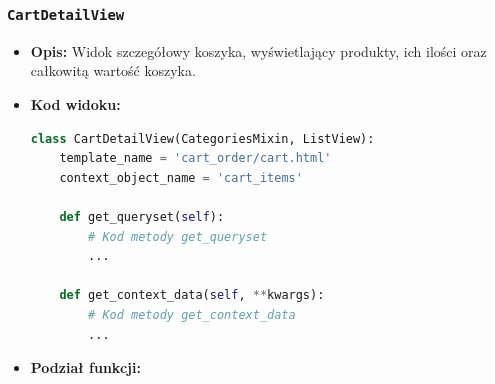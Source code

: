 \documentclass[12pt,a4paper,oneside]{article}
\theoremstyle{definition}
\numberwithin{equation}{section}
\begin{document}
\subsubsection*{\texttt{CartDetailView}}
\begin{itemize}
    \item \textbf{Opis:} Widok szczegółowy koszyka, wyświetlający produkty, ich ilości oraz całkowitą wartość koszyka.
    \item \textbf{Kod widoku:}
\begin{lstlisting}[language=Python, caption=\texttt{CartDetailView}]
class CartDetailView(CategoriesMixin, ListView):
    template_name = 'cart_order/cart.html'
    context_object_name = 'cart_items'

    def get_queryset(self):
        # Kod metody get_queryset
        ...

    def get_context_data(self, **kwargs):
        # Kod metody get_context_data
        ...
\end{lstlisting}

\item \textbf{Podział funkcji:}
\end{itemize}
\end{document}

